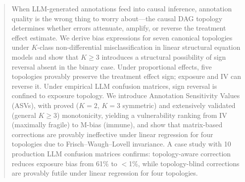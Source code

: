 \begin{abstract}
When LLM-generated annotations feed into causal inference, annotation quality is the wrong thing to worry about---the causal DAG topology determines whether errors attenuate, amplify, or reverse the treatment effect estimate. We derive bias expressions for seven canonical topologies under $K$-class non-differential misclassification in linear structural equation models and show that $K {\geq} 3$ introduces a structural possibility of sign reversal absent in the binary case. Under proportional effects, five topologies provably preserve the treatment effect sign; exposure and IV can reverse it. Under empirical LLM confusion matrices, sign reversal is confined to exposure topology. We introduce Annotation Sensitivity Values (ASVs), with proved ($K{=}2$, $K{=}3$ symmetric) and extensively validated (general $K{\geq}3$) monotonicity, yielding a vulnerability ranking from IV (maximally fragile) to M-bias (immune), and show that matrix-based corrections are provably ineffective under linear regression for four topologies due to Frisch--Waugh--Lovell invariance. A case study with 10 production LLM confusion matrices confirms: topology-aware correction reduces exposure bias from 61\% to $<$1\%, while topology-blind corrections are provably futile under linear regression for four topologies.
\end{abstract}
